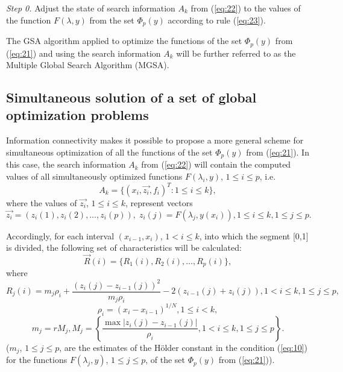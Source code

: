 \documentclass[runningheads]{llncs}
\begin{document}
\textit{Step 0.} Adjust the state of search information $A_k$ from (\ref{eq:22}) to the values of the function $F(\lambda, y)$ from the set $\Phi_p(y)$ according to rule (\ref{eq:23}).

The GSA algorithm applied to optimize the functions of the set $\Phi_p(y)$ from (\ref{eq:21}) and using the search information $A_k$ will be further referred to as the Multiple Global Search Algorithm (MGSA).

\subsection{Simultaneous solution of a set of global optimization problems} 
\label{subsec:43}

Information connectivity makes it possible to propose a more general scheme for simultaneous optimization of all the functions of the set $\Phi_p(y)$ from (\ref{eq:21}). In this case, the search information $A_k$ from (\ref{eq:22}) will contain the computed values of all simultaneously optimized functions $F(\lambda_i, y)$, $1 \leq i \leq p$, i.e. 
\begin{equation}
\label{eq:24}
A_k=\{(x_i,\overrightarrow{z_i},f_i )^T : 1 \leq i \leq k\},
\end{equation}
where the values of $\overrightarrow{z_i}$, $1 \leq i \leq k$, represent vectors 
\begin{equation}
\label{eq:25}
\overrightarrow{z_i}=( z_i (1),z_i (2), \dots ,z_i (p)), \; z_i (j)=F(\lambda_j,y(x_i)), 1\leq i \leq k, 1\leq j\leq p.
\end{equation}

Accordingly, for each interval $(x_{i-1},x_i)$, $1 < i \leq k$, into which the segment [0,1] is divided, the following set of characteristics will be calculated:
\begin{equation}
\label{eq:26}
\overrightarrow{R}(i)=\{R_1(i), R_2(i), \dots, R_p(i)\},
\end{equation}
where
\begin{equation}
\label{eq:27}
R_j(i)=m_j \rho_i+\frac{(z_i(j)-z_{i-1}(j))^2}{m_j \rho_i} - 2(z_{i-1}(j)+z_i(j)),1 < i \leq k,1 \leq j \leq p,
\end{equation}
\begin{equation}
\label{eq:28}
\rho_i=(x_i-x_{i-1} )^{1/N}  ,1 \leq i<k,
\end{equation}
\begin{equation}
\label{eq:29}
m_j = r M_j, M_j=\left\{ \frac{\max|z_i (j)-z_{i-1} (j)|}{\rho_i} ,1< i \leq k, 1 \leq j \leq p \right\}.
\end{equation}
($m_j$, $1 \leq j \leq p$, are the estimates of the H{\"o}lder  constant in the condition (\ref{eq:10}) for the functions $F(\lambda_j,y)$, $1 \leq j \leq p$, of the set $\Phi_p(y)$ from (\ref{eq:21})).
\end{document}
